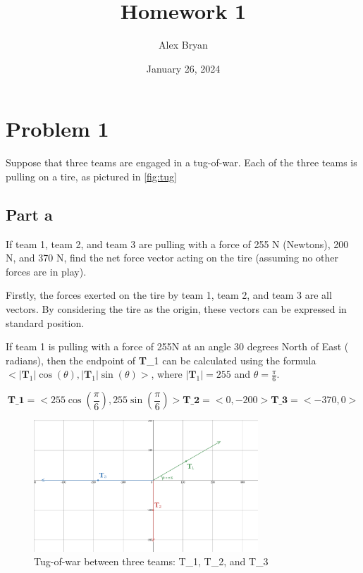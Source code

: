 \documentclass[12pt, letterpaper]{article}
\title{Homework 1}
\author{Alex Bryan}
\date{January 26, 2024}
\begin{document}
\maketitle

\section{Problem 1}

Suppose that three teams are engaged in a tug-of-war. Each of the three teams is pulling on a tire, as pictured in \ref{fig:tug}

\subsection{Part a}

If team 1, team 2, and team 3 are pulling with a force of 255 N (Newtons), 200 N, and 370
N, find the net force vector acting on the tire (assuming no other forces are in play).

Firstly, the forces exerted on the tire by team 1, team 2, and team 3 are all vectors. By considering the tire as the origin, these vectors can be expressed in standard position.

If team 1 is pulling with a force of 255N at an angle 30 degrees North of East ( radians), then the endpoint of \textbf{T}_1 can be calculated using the formula
$ < |\textbf{T}_1|\cos(\theta), |\textbf{T}_1|\sin(\theta) > $, where $ |\textbf{T}_1| = 255 $ and $ \theta = \frac{\pi}{6} $.

\begin{equation*}
    \textbf{T_{1}} = < 255\cos(\frac{\pi}{6}), 255\sin(\frac{\pi}{6}) >
    \textbf{T_{2}} = < 0, -200 >
    \textbf{T_{3}} = < -370, 0 >
\end{equation*}


\begin{figure}[hpt]
    \centering
    \includegraphics[width=0.75\textwidth]{tug}
    \caption{Tug-of-war between three teams: T_1, T_2, and T_3}
    \label{tug}
\end{figure}
\end{document}
